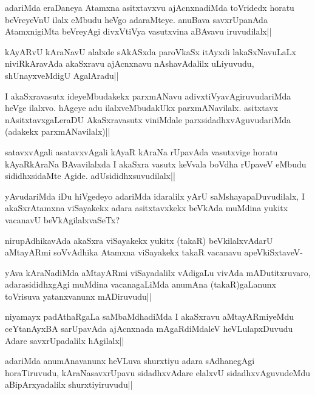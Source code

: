 \begin{artha}
adariMda eraDaneya Atamxna asitxtavxvu ajAcnxnadiMda toVridedx horatu beVreyeVnU ilalx eMbudu heVgo adaraMteye. anuBava savxrUpanAda AtamxnigiMta beVreyAgi divxVtiVya vasutxvina aBAvavu iruvudilalx||
\end{artha}

\begin{artha}
kAyARvU kAraNavU alalxde sAkASxda paroVkaSx itAyxdi lakaSxNavuLaLx niviRkAravAda akaSxravu ajAcnxnavu nAshavAdalilx uLiyuvudu, shUnayxveMdigU AgalAradu||
\end{artha}

\begin{artha}
I akaSxravasutx ideyeMbudakekx parxmANavu adivxtiVyavAgiruvudariMda heVge ilalxvo. hAgeye adu ilalxveMbudakUkx parxmANavilalx. asitxtavx nAsitxtavxgaLeraDU AkaSxravasutx viniMdale parxsidadhxvAguvudariMda (adakekx parxmANavilalx)||
\end{artha}

\begin{artha}%
satavxvAgali asatavxvAgali kAyaR kAraNa rUpavAda vasutxvige horatu kAyaRkAraNa BAvavilalxda I akaSxra vasutx keVvala boVdha rUpaveV eMbudu sididhxsidaMte Agide. adUsididhxsuvudilalx||
\end{artha}


\begin{artha}
yAvudariMda iDu hiVgedeyo adariMda idaralilx yArU saMshayapaDuvudilalx, I akaSxrAtamxna viSayakekx adara asitxtavxkekx beVkAda muMdina yukitx vacanavU beVkAgilalxvaSeTx?

nirupAdhikavAda akaSxra viSayakekx yukitx (takaR) beVkilalxvAdarU aMtayARmi soVvAdhika Atamxna viSayakekx takaR vacanavu apeVkiSxtaveV-
\end{artha}

\begin{artha}
yAva kAraNadiMda aMtayARmi viSayadalilx vAdigaLu vivAda mADutitxruvaro, adarasididhxgAgi muMdina vacanagaLiMda anumAna (takaR)gaLanunx toVrisuva yatanxvanunx mADiruvudu||
\end{artha}

\begin{artha}%
niyamayx padAthaRgaLa saMbaMdhadiMda I akaSxravu aMtayARmiyeMdu ceYtanAyxBA sarUpavAda ajAcnxnada mAgaRdiMdaleV heVLulapxDuvudu Adare savxrUpadalilx hAgilalx||
\end{artha}

\begin{artha}
adariMda anumAnavanunx heVLuva shurxtiyu adara sAdhanegAgi horaTiruvudu, kAraNasavxrUpavu sidadhxvAdare elalxvU sidadhxvAguvudeMdu aBipArxyadalilx shurxtiyiruvudu||
\end{artha}

